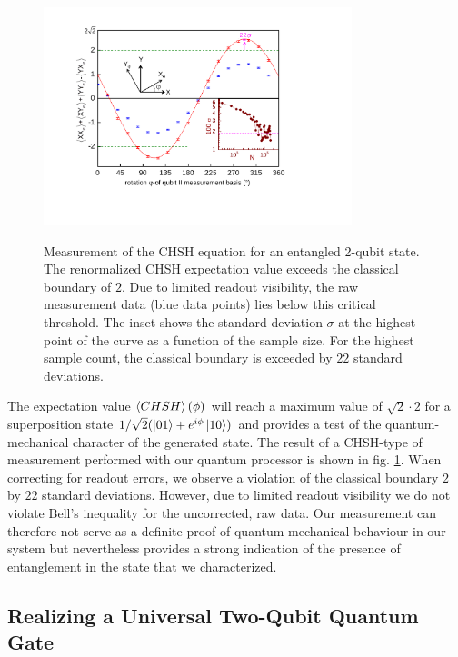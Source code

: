 \begin{figure}[htp]
	\centering
		\includegraphics[width=0.8\textwidth]{./material/papers/iswap/submission1/Dewes_Figure3}
	\label{fig:chsh_measurement}
	\caption{Measurement of the CHSH equation for an entangled 2-qubit state. The renormalized CHSH expectation value exceeds the classical boundary of $2$. Due to limited readout visibility, the raw measurement data (blue data points) lies below this critical threshold. The inset shows the standard deviation $\sigma$ at the highest point of the curve as a function of the sample size. For the highest sample count, the classical boundary is exceeded by $22$ standard deviations.}
\end{figure}

The expectation value $\left< CHSH \right>(\phi)$ will reach a maximum value of $\sqrt{2}\cdot 2$ for a superposition state $1/\sqrt{2}(\left| 01 \right>+e^{i\phi}\left| 10 \right>)$ and provides a test of the quantum-mechanical character of the generated state. The result of a CHSH-type of measurement performed with our quantum processor is shown in fig. \ref{fig:chsh_measurement}. When correcting for readout errors, we observe a violation of the classical boundary $2$ by $22$ standard deviations. However, due to limited readout visibility we do not violate Bell's inequality for the uncorrected, raw data. Our measurement can therefore not serve as a definite proof of quantum mechanical behaviour in our system but nevertheless provides a strong indication of the presence of entanglement in the state that we characterized.

\subsection{Realizing a Universal Two-Qubit Quantum Gate}

